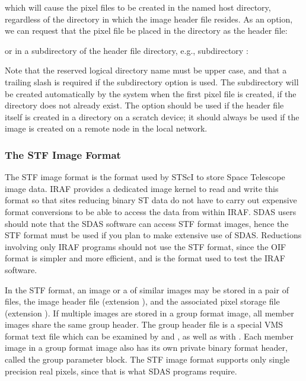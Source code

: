 \begin{quotation}\noindent
{}
\end{quotation}

\noindent
which will cause the pixel files to be created in the named host directory,
regardless of the directory in which the image header file resides.
As an option, we can request that the pixel file be placed in the
 directory as the header file:

\begin{quotation}\noindent
{}
\end{quotation}

\noindent
or in a subdirectory of the header file directory, e.g., subdirectory
:

\begin{quotation}\noindent
{}
\end{quotation}

\noindent
Note that the reserved logical directory name  must be upper
case, and that a trailing slash is required if the subdirectory option is used.
The subdirectory will be created automatically by the system when the first
pixel file is created, if the directory does not already exist.
The  option should  be used if the header file
itself is created in a directory on a scratch device; it should always be used
if the image is created on a remote node in the local network.

\subsubsection{The STF Image Format}

\ppind
The STF image format is the format used by STScI to store Space Telescope
image data.  IRAF provides a dedicated image kernel to read and write this
format so that sites reducing binary ST data do not have to carry out expensive
format conversions to be able to access the data from within IRAF.  SDAS
users should note that the SDAS software can  access STF
format images, hence the STF format must be used if you plan to make extensive
use of SDAS.  Reductions involving only IRAF programs should not use the STF
format, since the OIF format is simpler and more efficient, and is the format
used to test the IRAF software.

In the STF format, an image or a  of similar images may be
stored in a pair of files, the image header file (extension ),
and the associated pixel storage file (extension ).  If multiple
images are stored in a group format image, all member images share the same
group header.  The group header file is a special VMS format text file which
can be examined by  and , as well as with
.  Each member image in a group format image also has its
own private binary format header, called the group parameter block.  The STF
image format supports only single precision real pixels, since that is what
SDAS programs require.

